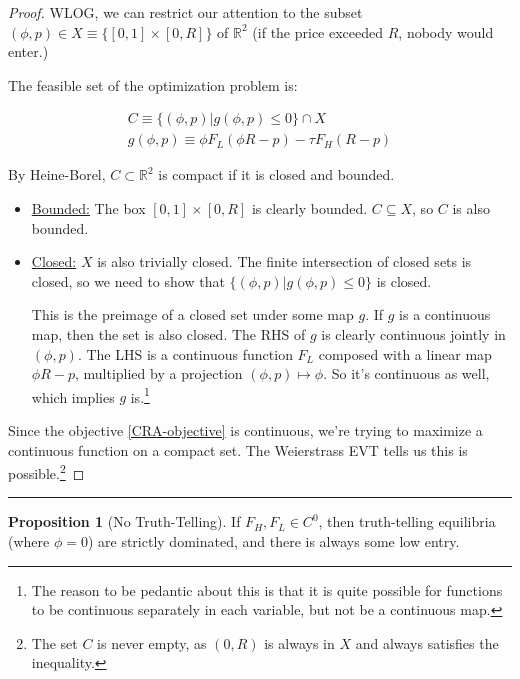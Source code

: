\documentclass{article}
\theoremstyle{definition}
\newtheorem{proposition}{Proposition}
\begin{document}
\begin{proof}
WLOG, we can restrict our attention to the subset $(\phi, p) \in X \equiv \{[0, 1] \times [0, R]\}$ of $\mathbb{R}^2$ (if the price exceeded $R$, nobody would enter.)

The feasible set of the optimization problem is: 

\begin{align}
    \label{set-C}
    C \equiv \{(\phi, p) | g(\phi, p) \leq 0\} \cap X \\ 
    g(\phi, p) \equiv  \phi F_L(\phi R - p) - \tau F_H (R - p)
\end{align}

By Heine-Borel, $C \subset \mathbb{R}^2$ is compact if it is closed and bounded. 

\begin{itemize}
    \item \underline{Bounded:} The box $[0, 1] \times [0, R]$ is clearly bounded. $C \subseteq X$, so $C$ is also bounded.

    \item \underline{Closed:} $X$ is also trivially closed. The finite intersection of closed sets is closed, so we need to show that $\{(\phi, p) | g(\phi, p) \leq 0\}$  is closed. 
    
    This is the preimage of a closed set under some map $g$. If $g$ is a continuous map, then the set is also closed. The RHS of $g$ is clearly continuous jointly in $(\phi, p)$. The LHS is a continuous function $F_L$ composed with a linear map $\phi R - p$, multiplied by a projection $(\phi, p) \mapsto \phi$. So it's continuous as well, which implies $g$ is.\footnote{The reason to be pedantic about this is that it is quite possible for functions to be continuous separately in each variable, but not be a continuous map.}
\end{itemize}

Since the objective \eqref{CRA-objective} is continuous, we're trying to maximize a continuous function on a compact set. The Weierstrass EVT tells us this is possible.\footnote{The set $C$ is never empty, as $(0, R)$ is always in $X$ and always satisfies the inequality.}
\end{proof}

\hrule \hspace{5 em} 

\begin{proposition}[No Truth-Telling] If $F_H, F_L \in C^0$, then truth-telling equilibria (where $\phi = 0$) are strictly dominated, and there is always some low entry.
\end{proposition}
\end{document}
